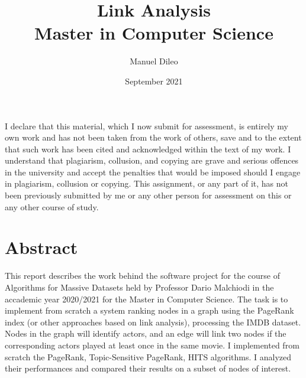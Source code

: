 \documentclass{article}
\title{%
  Link Analysis \\
  \large Master in Computer Science}
\author{Manuel Dileo}
\date{September 2021}
\begin{document}
\maketitle

I declare that this material, which I now submit for assessment, is entirely my own work and has not been taken from the work of others, save and to the extent that such work has been cited and acknowledged within the text of my work. I understand that plagiarism, collusion, and copying are grave and serious offences in the university and accept the penalties that would be imposed should I engage in plagiarism, collusion or copying. This assignment, or any part of it, has not been previously submitted by me or any other person for assessment on this or any other course of study.

\section*{Abstract}

This report describes the work behind the software project for the course of Algorithms for Massive Datasets held by Professor Dario Malchiodi in the accademic year 2020/2021 for the Master in Computer Science. The task is to implement from scratch a system ranking nodes in a graph using the PageRank index (or other approaches based on link analysis), processing the IMDB dataset. Nodes in the graph will identify actors, and an edge will link two nodes if the corresponding actors played at least once in the same movie. I implemented from scratch the PageRank, Topic-Sensitive PageRank, HITS algorithms. I analyzed their performances and compared their results on a subset of nodes of interest.

\pagebreak
\end{document}
